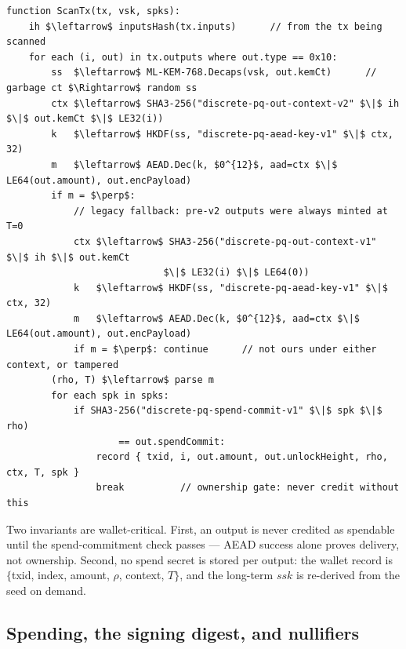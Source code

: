 \documentclass[11pt,a4paper]{article}
\begin{document}
\begin{algorithm}[tbp]
\caption{\textsc{Scan} --- recipient side, per transaction $\mathit{tx}$ with wallet spend-key candidates $\mathit{spks}$ (single-key-index: one shared key; aggregated-multikey: the primary plus known deposit keys).}
\label{alg:scan}
\begin{lstlisting}[style=pseudo]
function ScanTx(tx, vsk, spks):
    ih $\leftarrow$ inputsHash(tx.inputs)      // from the tx being scanned
    for each (i, out) in tx.outputs where out.type == 0x10:
        ss  $\leftarrow$ ML-KEM-768.Decaps(vsk, out.kemCt)      // garbage ct $\Rightarrow$ random ss
        ctx $\leftarrow$ SHA3-256("discrete-pq-out-context-v2" $\|$ ih $\|$ out.kemCt $\|$ LE32(i))
        k   $\leftarrow$ HKDF(ss, "discrete-pq-aead-key-v1" $\|$ ctx, 32)
        m   $\leftarrow$ AEAD.Dec(k, $0^{12}$, aad=ctx $\|$ LE64(out.amount), out.encPayload)
        if m = $\perp$:
            // legacy fallback: pre-v2 outputs were always minted at T=0
            ctx $\leftarrow$ SHA3-256("discrete-pq-out-context-v1" $\|$ ih $\|$ out.kemCt
                            $\|$ LE32(i) $\|$ LE64(0))
            k   $\leftarrow$ HKDF(ss, "discrete-pq-aead-key-v1" $\|$ ctx, 32)
            m   $\leftarrow$ AEAD.Dec(k, $0^{12}$, aad=ctx $\|$ LE64(out.amount), out.encPayload)
            if m = $\perp$: continue      // not ours under either context, or tampered
        (rho, T) $\leftarrow$ parse m
        for each spk in spks:
            if SHA3-256("discrete-pq-spend-commit-v1" $\|$ spk $\|$ rho)
                    == out.spendCommit:
                record { txid, i, out.amount, out.unlockHeight, rho, ctx, T, spk }
                break          // ownership gate: never credit without this
\end{lstlisting}
\end{algorithm}

Two invariants are wallet-critical. First, an output is never credited as
spendable until the spend-commitment check passes --- AEAD success alone
proves delivery, not ownership. Second, no spend secret is stored per output:
the wallet record is $\{$txid, index, amount, $\rho$, context, $T\}$, and the
long-term $\mathit{ssk}$ is re-derived from the seed on demand.

\subsection{Spending, the signing digest, and nullifiers}\label{sec:spending}
\end{document}
